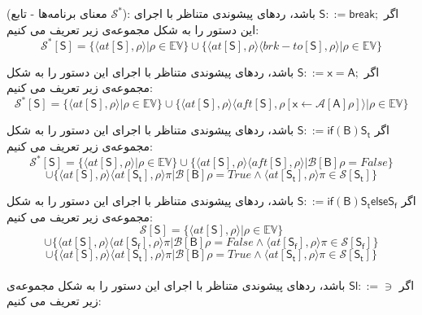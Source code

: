 \begin{defn}
	(معنای برنامه‌ها - تابع $\mathcal{S}^*$): 
اگر $        \mathsf{S} ::= \mathsf{break;}  $ باشد، ردهای پیشوندی متناظر با اجرای این دستور را به شکل مجموعه‌ی زیر تعریف می کنیم:
$$\mathcal{S^*} [\mathsf{S}] = \{ \langle at[\mathsf{S}] , \rho \rangle | \rho \in \mathbb{EV}       \} \cup     \{ \langle at[\mathsf{S}] , \rho \rangle \langle brk-to[\mathsf{S}] , \rho \rangle | \rho \in \mathbb{EV}       \}             $$   


اگر $        \mathsf{S} ::=  \mathsf{x=A;}  $ باشد، ردهای پیشوندی متناظر با اجرای این دستور را به شکل مجموعه‌ی زیر تعریف می کنیم:
$$\mathcal{S^*} [\mathsf{S}] = \{ \langle at[\mathsf{S}] , \rho \rangle | \rho \in \mathbb{EV}       \} \cup     \{ \langle at[\mathsf{S}] , \rho \rangle \langle aft[\mathsf{S}] , \rho[\mathsf{x}\leftarrow \mathcal{A}[\mathsf{A}]\rho] \rangle | \rho \in \mathbb{EV}       \}             $$   

اگر $         \mathsf{S} ::= \mathsf{if}  \mathsf{ (B) S_t}  $ باشد، ردهای پیشوندی متناظر با اجرای این دستور را به شکل مجموعه‌ی زیر تعریف می کنیم:
$$\mathcal{S^*} [\mathsf{S}] = \{ \langle at[\mathsf{S}] , \rho \rangle | \rho \in \mathbb{EV}       \} \cup     \{ \langle at[\mathsf{S}] , \rho \rangle \langle aft[\mathsf{S}] , \rho \rangle | \mathcal{B}[\mathsf{B}] \rho =False      \} 
$$$$\cup    \{ \langle at[\mathsf{S}] , \rho \rangle \langle at[\mathsf{S_t}] , \rho \rangle 
\pi | \mathcal{B}[\mathsf{B}] \rho =True  \wedge   \langle  at[\mathsf{S_t}]  , \rho \rangle \pi \in \mathcal{S} [\mathsf{S_t}]    \}          $$ 


اگر $         \mathsf{S} ::= \mathsf{if}  \mathsf{ (B) S_t else S_f}  $ باشد، ردهای پیشوندی متناظر با اجرای این دستور را به شکل مجموعه‌ی زیر تعریف می کنیم:
$$\mathcal{S} [\mathsf{S}] = \{ \langle at[\mathsf{S}] , \rho \rangle | \rho \in \mathbb{EV}       \} $$$$\cup     \{ \langle at[\mathsf{S}] , \rho \rangle \langle at[\mathsf{S_f}] , \rho \rangle 
\pi | \mathcal{B}[\mathsf{B}] \rho =False  \wedge   \langle  at[\mathsf{S_f}]  , \rho \rangle \pi \in \mathcal{S} [\mathsf{S_f}]    \}  
$$$$\cup    \{ \langle at[\mathsf{S}] , \rho \rangle \langle at[\mathsf{S_t}] , \rho \rangle 
\pi | \mathcal{B}[\mathsf{B}] \rho =True  \wedge   \langle  at[\mathsf{S_t}]  , \rho \rangle \pi \in \mathcal{S} [\mathsf{S_t}]    \}          $$ \\


اگر $         \mathsf{Sl} ::= \ni  $ باشد، ردهای پیشوندی متناظر با اجرای این دستور را به شکل مجموعه‌ی زیر تعریف می کنیم:


\end{defn}
